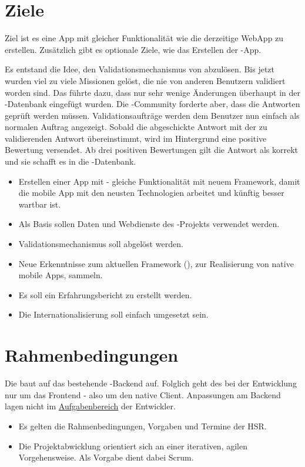 \section{Ziele}
\label{tb-einfuehrung-ziele}
Ziel ist es eine  App mit gleicher Funktionalität wie die derzeitige \gls{WebApp} zu erstellen.
Zusätzlich gibt es optionale Ziele, wie das Erstellen der -App.

Es entstand die Idee, den Validationsmechanismus von \kort{} abzulösen.
Bis jetzt wurden viel zu viele Missionen gelöst, die nie von anderen Benutzern validiert worden sind.
Das führte dazu, dass nur sehr wenige Änderungen überhaupt in der -Datenbank eingefügt wurden.
Die -Community forderte aber, dass die Antworten geprüft werden müssen.
Validationsaufträge werden dem Benutzer nun einfach als normalen Auftrag angezeigt.
Sobald die abgeschickte Antwort mit der zu validierenden Antwort übereinstimmt, wird im Hintergrund eine positive Bewertung versendet.
Ab drei positiven Bewertungen gilt die Antwort als korrekt und sie schafft es in die -Datenbank.

\begin{itemize}
	\item Erstellen einer  App mit  - gleiche Funktionalität mit neuem Framework, damit die mobile App mit den neusten Technologien arbeitet und künftig besser wartbar ist.
	\item Als Basis sollen Daten und Webdienste des -Projekts verwendet werden.
	\item Validationsmechanismus soll abgelöst werden.
	\item Neue Erkenntnisse zum aktuellen Framework (), zur Realisierung von native mobile Apps, sammeln.
	\item Es soll ein Erfahrungsbericht zu  erstellt werden.
	\item Die Internationalisierung soll einfach umgesetzt sein.
\end{itemize}

\section{Rahmenbedingungen}
Die  baut auf das bestehende \kort{}-Backend auf.
Folglich geht des bei der Entwicklung nur um das Frontend - also um den native Client.
Anpassungen am Backend lagen nicht im \hyperref[pd-anforderungsspezifikation]{Aufgabenbereich} der Entwickler.
\begin{itemize}
	\item Es gelten die Rahmenbedingungen, Vorgaben und Termine der HSR.
	\item Die Projektabwicklung orientiert sich an einer iterativen, agilen Vorgehensweise. 
	Als Vorgabe dient dabei Scrum.
\end{itemize}

